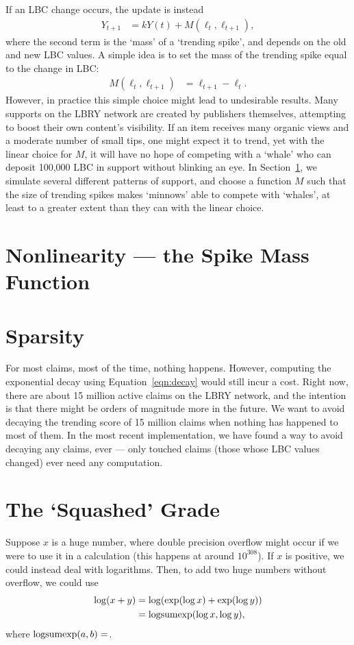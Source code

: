 \documentclass[a4paper, 12pt]{article}
\newcommand{\logsumexp}{\textnormal{logsumexp}}
\begin{document}
If an LBC change occurs, the update is instead
\begin{align}
Y_{t+1} &= kY(t) + M(\ell_t, \ell_{t+1}), \label{eqn:decay_with_spike}
\end{align}
where the second term is the `mass' of a `trending spike', and depends on
the old and new LBC values. A simple idea is to set the mass of the trending
spike equal to the change in LBC:
\begin{align}
M(\ell_t, \ell_{t+1}) &= \ell_{t+1} - \ell_t.
\end{align}
However, in practice this simple choice might lead to undesirable results.
Many supports on the LBRY network are created by publishers themselves,
attempting to boost their own content's visibility. If an item receives
many organic views and a moderate number of small tips, one might expect it
to trend, yet with the linear choice for $M$, it will have no hope of
competing with a `whale' who can deposit 100,000 LBC in support without
blinking an eye. In Section~\ref{sec:spike_mass}, we simulate several
different patterns of support, and choose a function $M$ such that
the size of trending spikes makes `minnows' able to compete with `whales',
at least to a greater extent than they can with the linear choice.

\section{Nonlinearity --- the Spike Mass Function}\label{sec:spike_mass}


\section{Sparsity}
For most claims, most of the time, nothing happens. However, computing the
exponential decay using Equation~\ref{eqn:decay} would still incur a cost.
Right now, there are about 15 million active claims on the LBRY network,
and the intention is that there might be orders of magnitude more in the
future. We want to avoid decaying the trending score of 15 million claims
when nothing has happened to most of them. In the most recent implementation,
we have found a way to avoid decaying any claims, ever --- only touched claims
(those whose LBC values changed) ever need any computation.

\section{The `Squashed' Grade}
Suppose $x$ is a huge number, where double precision overflow might occur if
we were to use it in a calculation (this happens at around $10^{308}$).
If $x$ is positive, we could instead deal with logarithms. Then, to add
two huge numbers without overflow, we could use
\begin{align}
\log(x + y)  &= \log(\exp(\log x) + \exp(\log y)) \\
             &= \logsumexp(\log x, \log y),
\end{align}
where $\logsumexp(a, b) = $.
\end{document}
